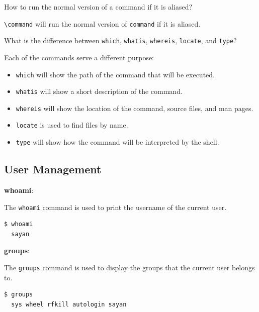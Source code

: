 \begin{qs}
  How to run the normal version of a command if it is aliased?
\end{qs}

\begin{ans}
  \texttt{\textbackslash command} will run the normal version of \texttt{command} if it is aliased.
\end{ans}

\begin{qs}
  What is the difference between \texttt{which}, \texttt{whatis}, \texttt{whereis}, \texttt{locate}, and \texttt{type}?
\end{qs}

\begin{ans}
  Each of the commands serve a different purpose:
  \begin{itemize}
    \item \texttt{which} will show the path of the command that will be executed.
    \item \texttt{whatis} will show a short description of the command.
    \item \texttt{whereis} will show the location of the command, source files, and man pages.
    \item \texttt{locate} is used to find files by name.
    \item \texttt{type} will show how the command will be interpreted by the shell.
  \end{itemize}
\end{ans}


\subsection{User Management}

\textbf{whoami}:

The \texttt{whoami} command is used to print the username of the current user.

\begin{lstlisting}[language=bash]
  $ whoami
  sayan
\end{lstlisting}

\textbf{groups}:

The \texttt{groups} command is used to display the groups that the current user belongs to.

\begin{lstlisting}[language=bash]
  $ groups
  sys wheel rfkill autologin sayan
\end{lstlisting}

